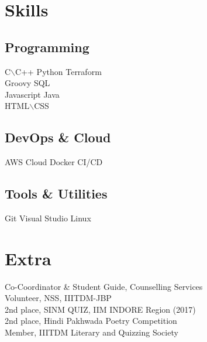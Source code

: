 \documentclass[]{single-page-resume}
\begin{document}
\begin{minipage}[t]{0.33\textwidth}

\section{Skills}
\subsection{Programming}
\textbullet{} C$\backslash$C++ \textbullet{} Python \textbullet{} Terraform \\
\textbullet{} Groovy \textbullet{} SQL \\
\textbullet{} Javascript \textbullet{} Java \\ \textbullet{}
 HTML$\backslash$CSS
 
\subsection{DevOps \& Cloud}
\textbullet{} AWS Cloud \textbullet{} Docker \textbullet{} CI/CD 

\subsection{Tools \& Utilities}
\textbullet{} Git \textbullet{} Visual Studio \textbullet{} Linux
\sectionsep

\section{Extra}
\textbullet{} Co-Coordinator \& Student Guide,
Counselling Services \\
\textbullet{} Volunteer, NSS, IIITDM-JBP \\
\textbullet{} 2nd place, SINM QUIZ, IIM INDORE
Region (2017) \\
\textbullet{} 2nd place, Hindi Pakhwada Poetry
Competition \\
\textbullet{} Member, IIITDM Literary and Quizzing
Society
\sectionsep
%
%

\end{minipage} 
\hfill
\end{document}
